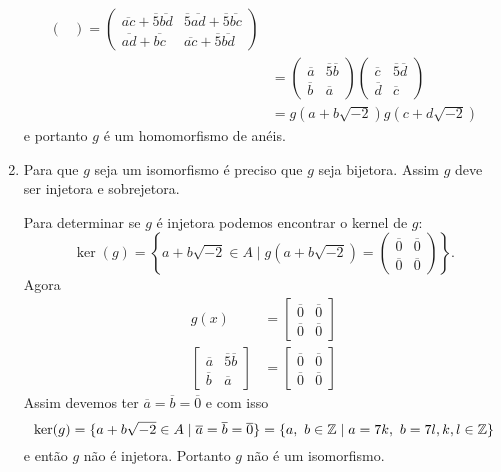 \documentclass[12pt]{exam}
\begin{document}
\begin{enumerate}[label=({\alph*})]
\begin{align*}
\begin{pmatrix}
            \end{pmatrix} = \begin{pmatrix}
            \overline{ac} + \overline{5}\overline{bd} & \overline{5}\overline{ad} + \overline{5}\overline{bc}\\\overline{ad} + \overline{bc} & \overline{ac} + \overline{5}\overline{bd}
            \end{pmatrix} \\ &= \begin{pmatrix}
            \overline{a} & \overline{5}\overline{b}\\\overline{b} & \overline{a}
            \end{pmatrix} \begin{pmatrix}
            \overline{c} & \overline{5}\overline{d}\\\overline{d} & \overline{c}
            \end{pmatrix} \\ &= g(a + b\sqrt{-2})g(c + d\sqrt{-2})
        \end{align*}
        e portanto $g$ é um homomorfismo de anéis.

         \item Para que $g$ seja um isomorfismo é preciso que $g$ seja bijetora. Assim $g$ deve ser injetora e sobrejetora.

        Para determinar se $g$ é injetora podemos encontrar o kernel de $g$:
        \[
            \ker(g) = \left\{a + b\sqrt{-2} \in A \mid g(a + b\sqrt{-2}) = \begin{pmatrix}
            \overline{0} & \overline{0}\\\overline{0} & \overline{0}
        \end{pmatrix}\right\}.
        \]
        Agora
        \begin{align*}
            g(x) &= \begin{bmatrix}\overline{0} & \overline{0}\\\overline{0} & \overline{0}\end{bmatrix}\\
            \begin{bmatrix}\overline{a} & \overline{5}\overline{b}\\\overline{b} & \overline{a}
            \end{bmatrix} &= \begin{bmatrix}
                \overline{0} & \overline{0}\\\overline{0} & \overline{0}
            \end{bmatrix}
        \end{align*}
        Assim devemos ter $\overline{a} = \overline{b} = \overline{0}$ e com isso
        \[
            \ker(g) = \{a + b\sqrt{-2} \in A \mid \overline{a} = \overline{b} = \overline{0}\} = \{a,\ b \in \mathbb{Z} \mid a = 7k,\ b = 7l, k,l \in \mathbb{Z}\}
        \]
        e então $g$ não é injetora. Portanto $g$ não é um isomorfismo.
    \end{enumerate}
    \vspace{1cm}
\end{document}
